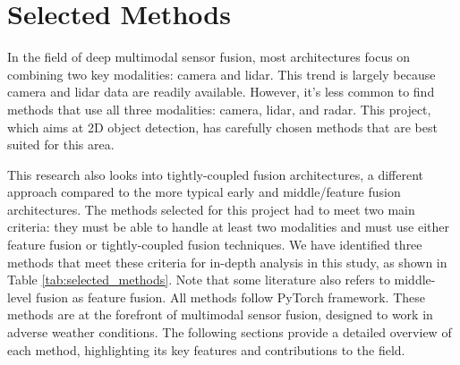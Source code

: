 \documentclass[report.tex]{subfiles}
\begin{document}
    \section{Selected Methods}


    In the field of deep multimodal sensor fusion, most architectures focus on combining two key modalities: camera and lidar. This trend is largely because camera and lidar data are readily available. However, it's less common to find methods that use all three modalities: camera, lidar, and radar. This project, which aims at 2D object detection, has carefully chosen methods that are best suited for this area.

    This research also looks into tightly-coupled fusion architectures, a different approach compared to the more typical early and middle/feature fusion architectures. The methods selected for this project had to meet two main criteria: they must be able to handle at least two modalities and must use either feature fusion or tightly-coupled fusion techniques. We have identified three methods that meet these criteria for in-depth analysis in this study, as shown in Table \ref{tab:selected_methods}. Note that some literature also refers to middle-level fusion as feature fusion. All methods follow PyTorch framework. These methods are at the forefront of multimodal sensor fusion, designed to work in adverse weather conditions. The following sections provide a detailed overview of each method, highlighting its key features and contributions to the field.
\end{document}
